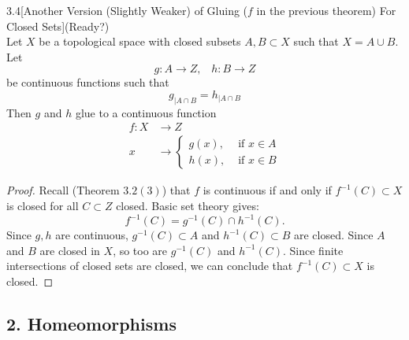 \begin{customthm}{3.4}[Another Version (Slightly Weaker) of Gluing ($f$ in the previous theorem) For Closed Sets](Ready?)\\
Let $X$ be a topological space with closed subsets $A, B \subset X$ such that $X = A\cup B$. Let 
        $$g: A \longrightarrow Z, \,\,\,\,\, h: B\longrightarrow Z$$
        be continuous functions such that 
        $$g_{\vert A \cap B} = h_{\vert A \cap B}$$
        Then $g$ and $h$ glue to a continuous function 
        \begin{align*}
            f:  X &\longrightarrow Z\\
                x &\longrightarrow \begin{cases}
               g(x), & \text{ if $x\in A$}\\
               h(x), & \text{ if $x\in B$}
               \end{cases}
        \end{align*}
\end{customthm}

\begin{proof}
Recall (Theorem $3.2(3)$) that $f$ is continuous if and only if $f^{-1}(C) \subset X$ is closed for all $C \subset Z$ closed. Basic set theory gives:
    $$f^{-1}(C) = g^{-1}(C) \cap h^{-1}(C).$$
    Since $g, h$ are continuous, $g^{-1}(C) \subset A$ and $h^{-1}(C) \subset B$ are closed. Since $A$ and $B$ are closed in $X$, so too are $g^{-1}(C)$ and $h^{-1}(C)$. Since finite intersections of closed sets are closed, we can conclude that $f^{-1}(C) \subset X$ is closed.
\end{proof}


\subsection*{2. Homeomorphisms}

